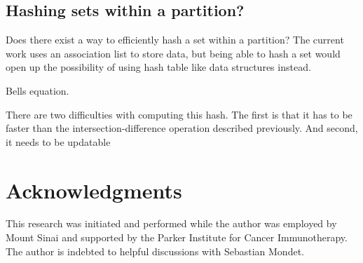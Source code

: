 \documentclass{article}
\begin{document}
\subsection{Hashing sets within a partition?}

Does there exist a way to efficiently hash a set within a partition?
The current work uses an association list to store data, but being able to
hash a set would open up the possibility of using hash table like data
structures instead.

Bells equation.

There are two difficulties with computing this hash.
The first is that it has to be faster than the intersection-difference
operation described previously.
And second, it needs to be updatable

\section{Acknowledgments}

This research was initiated and performed while the author was employed by
Mount Sinai and supported by the Parker Institute for Cancer Immunotherapy.
The author is indebted to helpful discussions with Sebastian Mondet.

\clearpage



\end{document}
